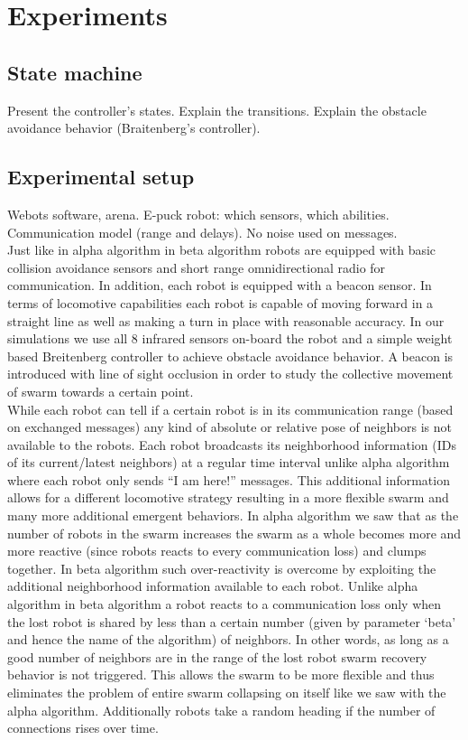 \documentclass[a4paper, 10pt, conference]{ieeeconf}
\begin{document}

\section{Experiments}
  \subsection{State machine}
  Present the controller's states. Explain the transitions. Explain the obstacle avoidance behavior (Braitenberg's controller).

  \subsection{Experimental setup} \label{simulations}
  Webots software, arena. E-puck robot: which sensors, which abilities. Communication model (range and delays). No noise used on messages.\\

  Just like in alpha algorithm in beta algorithm robots are equipped with basic collision avoidance sensors and short range omnidirectional radio for communication. In addition, each robot is equipped with a beacon sensor. In terms of locomotive capabilities each robot is capable of moving forward in a straight line as well as making a turn in place with reasonable accuracy. In our simulations we use all 8 infrared sensors on-board the robot and a simple weight based Breitenberg controller to achieve obstacle avoidance behavior. A beacon is introduced with line of sight occlusion in order to study the collective movement of swarm towards a certain point. \\
  While each robot can tell if a certain robot is in its communication range (based on exchanged messages) any kind of absolute or relative pose of neighbors is not available to the robots. Each robot broadcasts its neighborhood information (IDs of its current/latest neighbors) at a regular time interval unlike alpha algorithm where each robot only sends ``I am here!'' messages. This additional information allows for a different locomotive strategy resulting in a more flexible swarm and many more additional emergent behaviors. In alpha algorithm we saw that as the number of robots in the swarm increases the swarm as a whole becomes more and more reactive (since robots reacts to every communication loss) and clumps together. In beta algorithm such over-reactivity is overcome by exploiting the additional neighborhood information available to each robot. Unlike alpha algorithm in beta algorithm a robot reacts to a communication loss only when the lost robot is shared by less than a certain number (given by parameter `beta' and hence the name of the algorithm) of neighbors. In other words, as long as a good number of neighbors are in the range of the lost robot swarm recovery behavior is not triggered. This allows the swarm to be more flexible and thus eliminates the problem of entire swarm collapsing on itself like we saw with the alpha algorithm. Additionally robots take a random heading if the number of connections rises over time.
\end{document}

